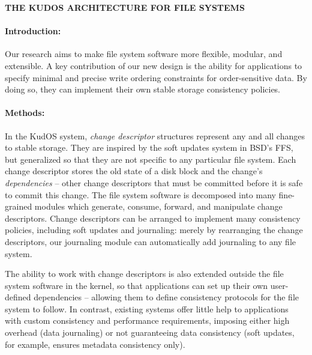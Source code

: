 \documentclass[12pt]{article}
\newcommand{\preparagraphspacing}{\vspace{-0.2in}}
\begin{document}
\noindent\textbf{THE KUDOS ARCHITECTURE FOR FILE SYSTEMS}




\preparagraphspacing
\paragraph{Introduction:}

Our research aims to make file system software more flexible, modular,
and extensible. A key contribution of our new design is the ability
for applications to specify minimal and precise write ordering
constraints for order-sensitive data. By doing so, they can implement
their own stable storage consistency policies.

\preparagraphspacing
\paragraph{Methods:}

In the KudOS system, \emph{change descriptor} structures represent any and all
changes to stable storage. They are inspired by the soft updates system in BSD's
FFS, but generalized so that they are not specific to any particular file
system. Each change descriptor stores the old state of a disk block and the
change's \emph{dependencies} -- other change descriptors that must be committed
before it is safe to commit this change. The file system software is decomposed
into many fine-grained modules which generate, consume, forward, and manipulate
change descriptors. Change descriptors can be arranged to implement many
consistency policies, including soft updates and journaling: merely by
rearranging the change descriptors, our journaling module can automatically add
journaling to any file system.

The ability to work with change descriptors is also extended outside the file
system software in the kernel, so that applications can set up their own
user-defined dependencies -- allowing them to define consistency protocols for
the file system to follow. In contrast, existing systems offer little help to
applications with custom consistency and performance requirements, imposing
either high overhead (data journaling) or not guaranteeing data consistency
(soft updates, for example, ensures metadata consistency only).
\end{document}
